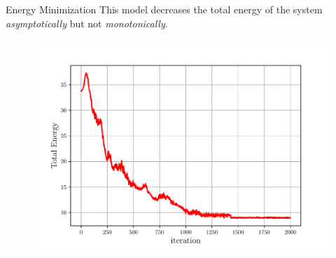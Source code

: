 \documentclass[usenames,dvipsnames]{beamer}
\begin{document}
\begin{frame}{Energy Minimization}
    This model decreases the total energy of the system \emph{asymptotically} but not \emph{monotonically}.
    \begin{figure}
        \centering
        \includegraphics[scale=0.5]
        {figures/3d_voronoi/3D_energy.pdf}
    \end{figure}
\end{frame}
\end{document}
